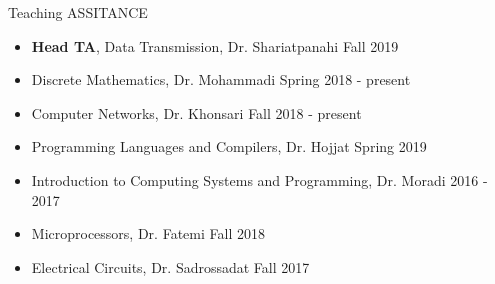 \documentclass{resume}
\begin{document}

\begin{rSection}{Teaching ASSITANCE}

\begin{rSubsection}{}{}{}{}
\begin{itemize} \itemsep -6pt
\item \textbf{Head TA}, Data Transmission, Dr. Shariatpanahi \hfill Fall 2019
\item Discrete Mathematics, Dr. Mohammadi \hfill Spring 2018 - present
\item Computer Networks, Dr. Khonsari \hfill Fall 2018 - present
\item Programming Languages and Compilers, Dr. Hojjat \hfill Spring 2019
\item Introduction to Computing Systems and Programming, Dr. Moradi \hfill 2016 - 2017
\item Microprocessors, Dr. Fatemi \hfill Fall 2018
\item Electrical Circuits, Dr. Sadrossadat \hfill Fall 2017
\end{itemize}
\end{rSubsection}

\end{rSection}

\end{document}
